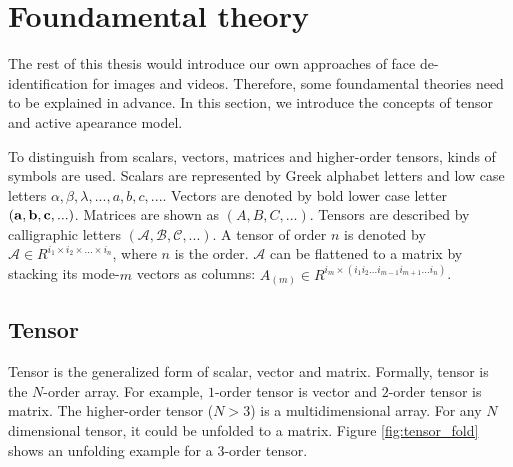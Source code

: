 \chapter{Foundamental theory}
\label{chap:foundamental}

The rest of this thesis would introduce our own approaches of face de-identification
for images and videos. Therefore, some foundamental theories need to be explained in
advance. In this section, we introduce the concepts of tensor and active apearance model.

To distinguish from scalars, vectors, matrices and higher-order tensors, kinds of 
symbols are used. Scalars are represented by Greek alphabet letters and low case letters $\alpha,\beta,
\lambda,...,a,b,c,...$. Vectors are denoted by bold lower case letter ${\bf (a,b,c,...)}$. Matrices are
shown as $(A,B,C,...)$. Tensors are described by calligraphic letters $(\mathcal{A,B,C,...})$. 
A tensor of order $n$ is denoted by $\mathcal{A} \in R^{i_1 \times i_2 \times ... \times i_n}$, where $n$ 
is the order. $\mathcal{A}$ can be flattened to a matrix by stacking its mode-$m$ vectors as columns: 
$A_{(m)} \in R^{i_m \times (i_1i_2...i_{m-1}i_{m+1}...i_n)}$. 



\section{Tensor}

Tensor is the generalized form of scalar, vector and matrix. 
Formally, tensor is the $N$-order array. For example, $1$-order 
tensor is vector and $2$-order tensor is matrix. The higher-order 
tensor ($N > 3$) is a multidimensional array. For any $N$ 
dimensional tensor, it could be unfolded to a matrix.
Figure \ref{fig:tensor_fold} shows an unfolding example for a $3$-order tensor.

